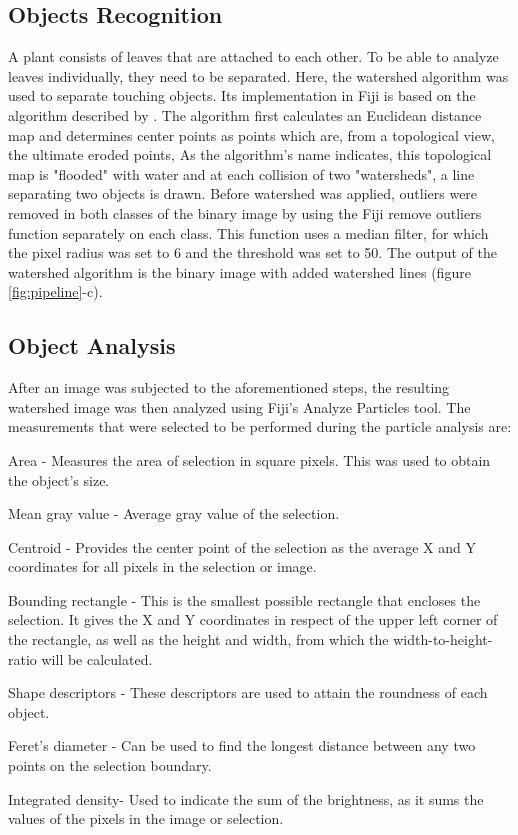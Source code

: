 \documentclass[paper=A4,bibliography=totocnumbered]{scrartcl}
\begin{document}
\subsection{Objects Recognition}
A plant consists of leaves that are attached to each other. To be able to analyze leaves individually, they need to be separated. Here, the watershed algorithm was used to separate touching objects. Its implementation in Fiji is based on the algorithm described by \citet{Kunt.1990}. The algorithm first calculates an Euclidean distance map and determines center points as points which are, from a topological view, the ultimate eroded points, As the algorithm's name indicates, this topological map is "flooded" with water and at each collision of two "watersheds", a line separating two objects is drawn. Before watershed was applied, outliers were removed in both classes of the binary image by using the Fiji remove outliers function separately on each class. This function uses a median filter, for which the pixel radius was set to 6 and the threshold was set to 50. The output of the watershed algorithm is the binary image with added watershed lines (figure \ref{fig:pipeline}-c). 

\subsection{Object Analysis}
After an image was subjected to the aforementioned steps, the resulting watershed image was then analyzed using Fiji's Analyze Particles tool. The measurements that were selected to be performed during the particle analysis are:

\begin{compactitem}
\item Area - Measures the area of selection in square pixels. This was used to obtain the object's size.
\item Mean gray value - Average gray value of the selection.
\item Centroid - Provides the center point of the selection as the average X and Y coordinates for all pixels in the selection or image.
\item Bounding rectangle - This is the smallest possible rectangle that encloses the selection. It gives the X and Y coordinates in respect of the upper left corner of the rectangle, as well as the height and width, from which the width-to-height-ratio will be calculated.
\item Shape descriptors - These descriptors are used to attain the roundness of each object.
\item Feret's diameter - Can be used to find the longest distance between any two points on the selection boundary.
\item Integrated density- Used to indicate the sum of the brightness, as it sums the values of the pixels in the image or selection.
\end{compactitem} 
\end{document}
